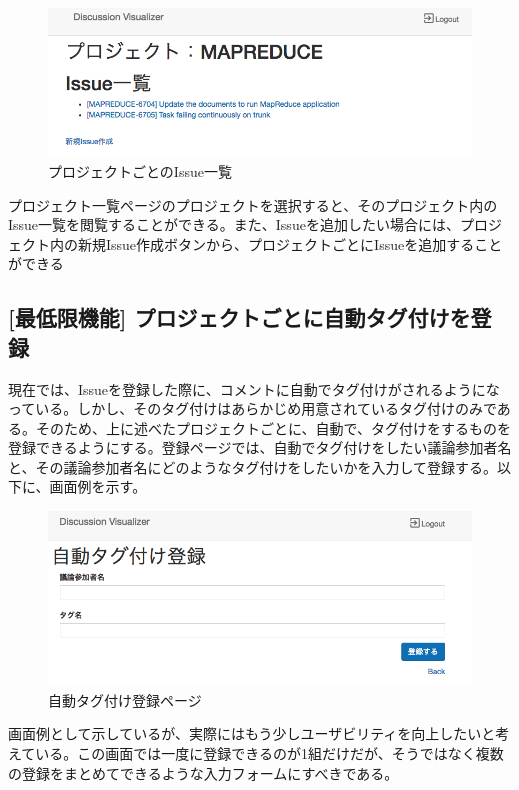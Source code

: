 \documentclass[12pt, oneside]{jreport}
\begin{document}
		\begin{figure}[H]
		\centering
		\includegraphics[width=17cm,bb=500 300 -200 27]{ProjectIssueList.png}
		\caption{プロジェクトごとのIssue一覧}
		\end{figure}
		
		プロジェクト一覧ページのプロジェクトを選択すると、そのプロジェクト内のIssue一覧を閲覧することができる。また、Issueを追加したい場合には、プロジェクト内の新規Issue作成ボタンから、プロジェクトごとにIssueを追加することができる
		
		\subsection{[最低限機能] プロジェクトごとに自動タグ付けを登録}
		現在では、Issueを登録した際に、コメントに自動でタグ付けがされるようになっている。しかし、そのタグ付けはあらかじめ用意されているタグ付けのみである。そのため、上に述べたプロジェクトごとに、自動で、タグ付けをするものを登録できるようにする。登録ページでは、自動でタグ付けをしたい議論参加者名と、その議論参加者名にどのようなタグ付けをしたいかを入力して登録する。以下に、画面例を示す。
		\begin{figure}[H]
		\centering
		\includegraphics[width=17cm,bb=500 300 -200 27]{TagAdd.png}
		\caption{自動タグ付け登録ページ}
		\end{figure}
		
		画面例として示しているが、実際にはもう少しユーザビリティを向上したいと考えている。この画面では一度に登録できるのが1組だけだが、そうではなく複数の登録をまとめてできるような入力フォームにすべきである。
\end{document}
